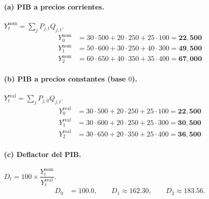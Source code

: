 \documentclass[11pt,addpoints]{article}
\begin{document}
\paragraph{(a) PIB a precios corrientes.} \(Y_t^{\text{nom}}=\sum_j P_{j,t}Q_{j,t}\).
\begin{align*}
Y_0^{\text{nom}} &= 30\cdot 500 + 20\cdot 250 + 25\cdot 100 = \mathbf{22{,}500} \\
Y_1^{\text{nom}} &= 50\cdot 600 + 30\cdot 250 + 40\cdot 300 = \mathbf{49{,}500} \\
Y_2^{\text{nom}} &= 60\cdot 650 + 40\cdot 350 + 35\cdot 400 = \mathbf{67{,}000}
\end{align*}

\paragraph{(b) PIB a precios constantes (base \(0\)).} \(Y_t^{\text{real}}=\sum_j P_{j,0}Q_{j,t}\).
\begin{align*}
Y_0^{\text{real}} &= 30\cdot 500 + 20\cdot 250 + 25\cdot 100 = \mathbf{22{,}500} \\
Y_1^{\text{real}} &= 30\cdot 600 + 20\cdot 250 + 25\cdot 300 = \mathbf{30{,}500} \\
Y_2^{\text{real}} &= 30\cdot 650 + 20\cdot 350 + 25\cdot 400 = \mathbf{36{,}500}
\end{align*}
\newpage %
\vspace*{0.1cm} %
\paragraph{(c) Deflactor del PIB.} \(D_t = 100\times \dfrac{Y_t^{\text{nom}}}{Y_t^{\text{real}}}\).
\begin{align*}
D_0 &= 100.0,\qquad
D_1 \approx \mathbf{162.30},\qquad
D_2 \approx \mathbf{183.56}.
\end{align*}
\end{document}
